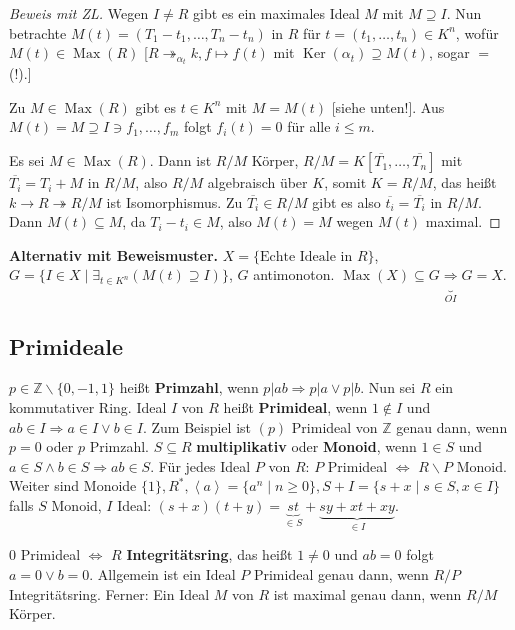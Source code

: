 \documentclass[headsepline=true,DIV=11]{scrartcl}
\theoremstyle{definition}
\renewcommand{\bar}[1]{\overline{#1}}
\newcommand{\Max}{\operatorname{Max}}
\newcommand{\Ker}{\operatorname{Ker}}
\begin{document}
\begin{proof}[Beweis mit ZL]
  Wegen $I\neq R$ gibt es ein maximales Ideal $M$ mit $M\supseteq I$. Nun betrachte $M(t)=(T_1-t_1,\ldots,T_n-t_n)$ in $R$ für $t=(t_1,\ldots,t_n)\in
  K^n$, wofür $M(t)\in\Max(R)$ [$R \twoheadrightarrow_{\alpha_t} k, f\mapsto f(t)$ mit $\Ker(\alpha_t)\supseteq M(t)$, sogar $=$ (!).]

  Zu $M\in\Max(R)$ gibt es $t\in K^n$ mit $M=M(t)$ [siehe unten!]. Aus $M(t)=M\supseteq I\ni f_1,\ldots,f_m$ folgt $f_i(t)=0$ für alle $i\le m$.

  Es sei $M\in\Max(R)$. Dann ist $R/M$ Körper, $R/M=K[\bar{T_1},\ldots,\bar{T_n}]$ mit $\bar{T_i}=T_i+M$ in $R/M$, also $R/M$ algebraisch über $K$,
  somit $K=R/M$, das heißt $k\rightarrow R \twoheadrightarrow R/M$ ist Isomorphismus. Zu $\bar{T_i}\in R/M$ gibt es also $\bar{t_i}=\bar{T_i}$ in
  $R/M$. Dann $M(t)\subseteq M$, da $T_i-t_i\in M$, also $M(t)=M$ wegen $M(t)$ maximal.
\end{proof}

{\bf Alternativ mit Beweismuster.} $X=\{\mbox{Echte Ideale in }R\}$, $G=\{I\in X\mid\exists_{t\in K^n}(M(t)\supseteq I)\}$, $G$
antimonoton. $\Max(X)\subseteq G \underbrace{\Rightarrow}_{OI} G=X$.


\subsection{Primideale}

$p\in\mathbb{Z}\backslash\{0,-1,1\}$ heißt {\bf Primzahl}, wenn $p|ab\Rightarrow p|a \vee p|b$. Nun sei $R$ ein kommutativer Ring. Ideal $I$ von $R$
heißt {\bf Primideal}, wenn $1\not\in I$ und $ab\in I\Rightarrow a\in I \vee b\in I$. Zum Beispiel ist $(p)$ Primideal von $\mathbb{Z}$ genau dann,
wenn $p=0$ oder $p$ Primzahl. $S\subseteq R$ {\bf multiplikativ} oder {\bf Monoid}, wenn $1\in S$ und $a\in S\wedge b\in S\Rightarrow ab\in S$. Für
jedes Ideal $P$ von $R$: $P$ Primideal $\Leftrightarrow$ $R\backslash P$ Monoid. Weiter sind Monoide $\{1\},R^*,\left<a\right>=\{a^n\mid n\ge 0\},
S+I=\{s+x\mid s\in S,x\in I\}$ falls $S$ Monoid, $I$ Ideal: $(s+x)(t+y) = \underbrace{st}_{\in S}+\underbrace{sy+xt+xy}_{\in I}$.

$0$ Primideal $\Leftrightarrow$ $R$ {\bf Integritätsring}, das heißt $1\neq 0$ und $ab=0$ folgt $a=0\vee b=0$. Allgemein ist ein Ideal $P$ Primideal genau dann,
wenn $R/P$ Integritätsring. Ferner: Ein Ideal $M$ von $R$ ist maximal genau dann, wenn $R/M$ Körper.
\end{document}
